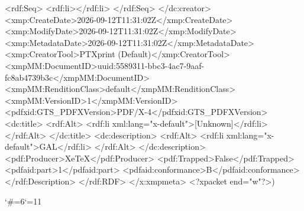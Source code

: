 {          <rdf:Seq>
            <rdf:li></rdf:li>
          </rdf:Seq>
        </dc:creator>
        <xmp:CreateDate>2026-09-12T11:31:02Z</xmp:CreateDate>
        <xmp:ModifyDate>2026-09-12T11:31:02Z</xmp:ModifyDate>
        <xmp:MetadataDate>2026-09-12T11:31:02Z</xmp:MetadataDate>
        <xmp:CreatorTool>PTXprint (Default)</xmp:CreatorTool>
        <xmpMM:DocumentID>uuid:5589311-bbc3-4ac7-9aaf-fc8ab4739b3c</xmpMM:DocumentID>
        <xmpMM:RenditionClass>default</xmpMM:RenditionClass>
        <xmpMM:VersionID>1</xmpMM:VersionID>
        <pdfxid:GTS_PDFXVersion>PDF/X-4</pdfxid:GTS_PDFXVersion>
        <dc:title>
          <rdf:Alt>
            <rdf:li xml:lang="x-default">[Unknown]</rdf:li>
          </rdf:Alt>
        </dc:title>
        <dc:description>
          <rdf:Alt>
            <rdf:li xml:lang="x-default">GAL</rdf:li>
          </rdf:Alt>
        </dc:description>
        <pdf:Producer>XeTeX</pdf:Producer>
        <pdf:Trapped>False</pdf:Trapped>
      <pdfaid:part>1</pdfaid:part>
      <pdfaid:conformance>B</pdfaid:conformance>
      </rdf:Description>
  </rdf:RDF>
</x:xmpmeta>
<?xpacket end="w"?>)}
\egroup
\catcode`\#=6\catcode`\@=11 \activ@tecustomch@rs







